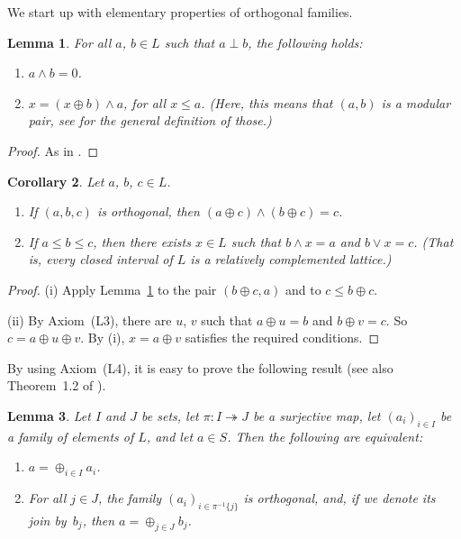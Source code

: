 \documentclass[psamsfonts,reqno]{memo-l}
\theoremstyle{plain}
\newtheorem{lemma}{Lemma}[section]
\newtheorem{corollary}[lemma]{Corollary}
\theoremstyle{definition}
\theoremstyle{remark}
\numberwithin{equation}{section}
\newcommand{\pup}[1]{\textup{(}{#1}\textup{)}}
\newcommand{\set}[1]{\{#1\}}
\newcommand{\famm}[2]{(#1)_{#2}}
\begin{document}
We start up with elementary properties of orthogonal families.

\begin{lemma}\label{L:ModPair}
For all $a$, $b\in L$ such that $a\perp b$, the following holds:
\begin{enumerate}
\item $a\wedge b=0$.

\item $x=(x\oplus b)\wedge a$, for all $x\leq a$. \pup{Here, this means that
$(a,b)$ is a \emph{modular pair}, see \cite{GLT2}\index{Gr\"atzer, G.} for
the general definition of those.}

\end{enumerate}

\end{lemma}

\begin{proof}
As in \cite[Lemma~1.1]{SMae55}.
\end{proof}

\begin{corollary}\label{C:RelComp}
Let $a$, $b$, $c\in L$.
\begin{enumerate}
\item If $(a,b,c)$ is orthogonal, then $(a\oplus c)\wedge(b\oplus c)=c$.

\item If $a\leq b\leq c$, then there exists $x\in L$ such that $b\wedge x=a$
and $b\vee x=c$. \pup{That is, every closed interval of $L$ is a
\emph{relatively complemented} lattice.}
\end{enumerate}

\end{corollary}

\begin{proof}
(i) Apply Lemma~\ref{L:ModPair} to the pair $(b\oplus c,a)$ and to
$c\leq b\oplus c$.

(ii) By Axiom~(L3), there are $u$, $v$ such that $a\oplus u=b$ and
$b\oplus v=c$. So $c=a\oplus u\oplus v$. By (i), $x=a\oplus v$ satisfies the
required conditions.
\end{proof}

By using Axiom~(L4), it is easy to prove the following result (see also
Theorem~1.2 of \cite{SMae55}).

\begin{lemma}\label{L:LattAssoc}
Let $I$ and $J$ be sets, let
$\pi\colon I\twoheadrightarrow J$ be a surjective map, let
$\famm{a_i}{i\in I}$ be a family of elements of $L$, and let $a\in S$.
Then the following are equivalent:

\begin{enumerate}
\item $a=\oplus_{i\in I}a_i$.

\item For all $j\in J$, the family $\famm{a_i}{i\in\pi^{-1}\set{j}}$ is
orthogonal, and, if we denote its join by~$b_j$, then $a=\oplus_{j\in J}b_j$.
\end{enumerate}
\end{lemma}
\end{document}
